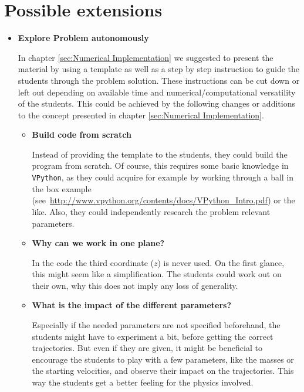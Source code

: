 \documentclass[12pt,ngerman,american]{iopart}
\begin{document}
\section{Possible extensions}\label{sec:extensions}

\begin{itemize}

\item \textbf{Explore Problem autonomously}

In chapter \ref{sec:Numerical Implementation} we suggested to present the material by using a template as well as a step by step instruction to guide the students through the problem solution.
These instructions can be cut down or left out depending on available time and numerical/computational versatility of the students.
This could be achieved by the following changes or additions to the concept presented in chapter \ref{sec:Numerical Implementation}.

\begin{itemize}
\item \textbf{Build code from scratch}

Instead of providing the template to the students, they could build the program from scratch.
Of course, this requires some basic knowledge in \texttt{VPython}, as they could acquire for example by working through a ball in the box example (see~\url{http://www.vpython.org/contents/docs/VPython_Intro.pdf}) or the like.
Also, they could independently research the problem relevant parameters.
\item \textbf{Why can we work in one plane?}

In the code the third coordinate ($z$) is never used.
On the first glance, this might seem like a simplification.
The students could work out on their own, why this does not imply any loss of generality.
\item \textbf{What is the impact of the different parameters?}

Especially if the needed parameters are not specified beforehand, the students might have to experiment a bit, before getting the correct trajectories.
But even if they are given, it might be beneficial to encourage the students to play with a few parameters, like the masses or the starting velocities, and observe their impact on the trajectories.
This way the students get a better feeling for the physics involved.
\end{itemize}


\end{itemize}
\end{document}
